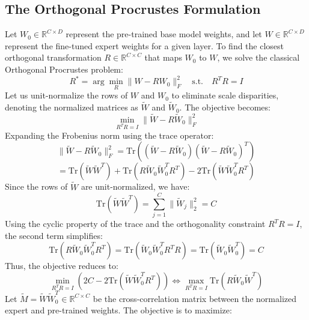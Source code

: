 \documentclass{article}
\theoremstyle{plain}
\theoremstyle{definition}
\theoremstyle{remark}
\begin{document}
\subsection{The Orthogonal Procrustes Formulation}
Let $W_0 \in \mathbb{R}^{C \times D}$ represent the pre-trained base model weights, and let $W \in \mathbb{R}^{C \times D}$ represent the fine-tuned expert weights for a given layer. To find the closest orthogonal transformation $R \in \mathbb{R}^{C \times C}$ that maps $W_0$ to $W$, we solve the classical Orthogonal Procrustes problem:
\begin{equation}
    R^* = \arg\min_{R} \| W - R W_0 \|_F^2 \quad \text{s.t.} \quad R^T R = I
\end{equation}
Let us unit-normalize the rows of $W$ and $W_0$ to eliminate scale disparities, denoting the normalized matrices as $\tilde{W}$ and $\tilde{W}_0$. The objective becomes:
\begin{equation}
    \min_{R^T R = I} \| \tilde{W} - R \tilde{W}_0 \|_F^2
\end{equation}
Expanding the Frobenius norm using the trace operator:
\begin{equation}
    \| \tilde{W} - R \tilde{W}_0 \|_F^2 = \text{Tr}\left( (\tilde{W} - R \tilde{W}_0)(\tilde{W} - R \tilde{W}_0)^T \right)
\end{equation}
\begin{equation}
    = \text{Tr}(\tilde{W} \tilde{W}^T) + \text{Tr}(R \tilde{W}_0 \tilde{W}_0^T R^T) - 2 \text{Tr}( \tilde{W} \tilde{W}_0^T R^T )
\end{equation}
Since the rows of $\tilde{W}$ are unit-normalized, we have:
\begin{equation}
    \text{Tr}(\tilde{W} \tilde{W}^T) = \sum_{j=1}^C \|\tilde{W}_j\|_2^2 = C
\end{equation}
Using the cyclic property of the trace and the orthogonality constraint $R^T R = I$, the second term simplifies:
\begin{equation}
    \text{Tr}(R \tilde{W}_0 \tilde{W}_0^T R^T) = \text{Tr}(\tilde{W}_0 \tilde{W}_0^T R^T R) = \text{Tr}(\tilde{W}_0 \tilde{W}_0^T) = C
\end{equation}
Thus, the objective reduces to:
\begin{equation}
    \min_{R^T R = I} \left( 2C - 2 \text{Tr}( \tilde{W} \tilde{W}_0^T R^T ) \right) \iff \max_{R^T R = I} \text{Tr}( R \tilde{W}_0 \tilde{W}^T )
\end{equation}
Let $\tilde{M} = \tilde{W} \tilde{W}_0^T \in \mathbb{R}^{C \times C}$ be the cross-correlation matrix between the normalized expert and pre-trained weights. The objective is to maximize:
\end{document}
